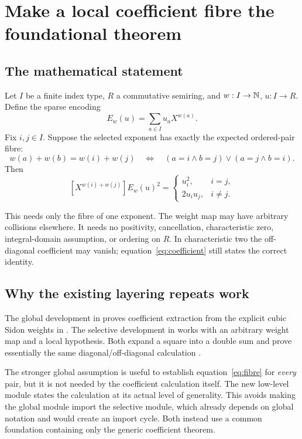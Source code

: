 \section{Make a local coefficient fibre the foundational theorem}
\label{sec:coefficients}

\subsection{The mathematical statement}

Let \(I\) be a finite index type, \(R\) a commutative semiring, and
\(w:I\to\mathbb N\), \(u:I\to R\). Define the sparse encoding
\[
  E_w(u)=\sum_{a\in I}u_aX^{w(a)}.
\]
Fix \(i,j\in I\). Suppose the selected exponent has exactly the expected
ordered-pair fibre:
\begin{equation}
\label{eq:fibre}
w(a)+w(b)=w(i)+w(j)
\quad\Longleftrightarrow\quad
(a=i\land b=j)\lor(a=j\land b=i).
\end{equation}
Then
\begin{equation}
\label{eq:coefficient}
[X^{w(i)+w(j)}]E_w(u)^2=
\begin{cases}
u_i^2,& i=j,\\
2u_i u_j,& i\ne j.
\end{cases}
\end{equation}

This needs only the fibre of one exponent. The weight map may have arbitrary
collisions elsewhere. It needs no positivity, cancellation, characteristic
zero, integral-domain assumption, or ordering on \(R\). In characteristic
two the off-diagonal coefficient may vanish; equation~\eqref{eq:coefficient}
still states the correct identity.

\subsection{Why the existing layering repeats work}

The global development in  proves coefficient
extraction from the explicit cubic Sidon weights in .
The selective development in  works with an
arbitrary weight map and a local  hypothesis. Both expand a
square into a double sum and prove essentially the same diagonal/off-diagonal
calculation \cite{quadratic,selective,sidon}.

The stronger global assumption is useful to establish
equation~\eqref{eq:fibre} for \emph{every} pair, but it is not needed by the
coefficient calculation itself. The new low-level module
 states the calculation at its actual level of
generality. This avoids making the global module import the selective
module, which already depends on global notation and would create an
import cycle. Both instead use a common foundation containing only the
generic coefficient theorem.

